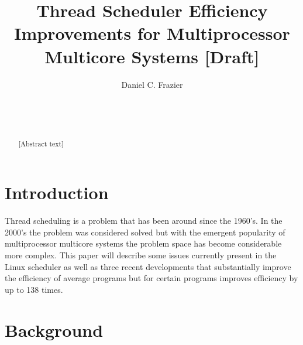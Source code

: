 \documentclass{sig-alternate}
\begin{document}

\title{Thread Scheduler Efficiency Improvements for Multiprocessor Multicore Systems [Draft]}


\author{
\alignauthor
Daniel C. Frazier\\
	\\
	\\
	\\
}
\maketitle


\begin{abstract}
[Abstract text]
\end{abstract}


\section{Introduction}
\label{sec:intro}

Thread scheduling is a problem that has been around since the 1960's. In the 2000's the problem was considered solved but with the emergent popularity of multiprocessor multicore systems the problem space has become considerable more complex. This paper will describe some issues currently present in the Linux scheduler as well as three recent developments that substantially improve the efficiency of average programs but for certain programs improves efficiency by up to 138 times.

\section{Background}
\label{sec:bg}
\end{document}
